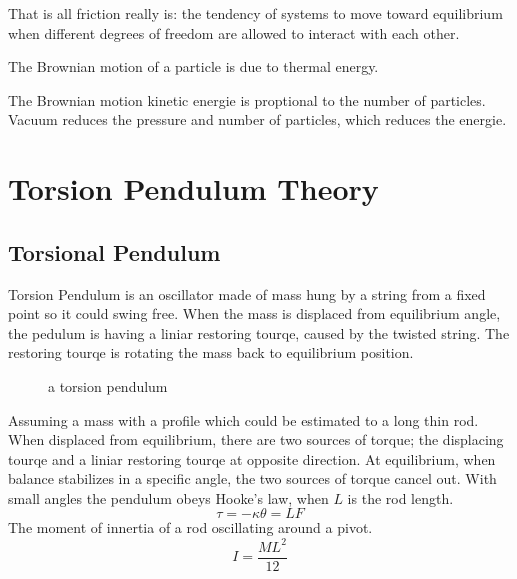 \documentclass[\main/master.tex]{subfiles}
\begin{document}
That is all friction really is: the tendency of systems to move toward equilibrium when different degrees of freedom are allowed to interact with each other.

The Brownian motion of a particle is due to thermal energy. 

The Brownian motion kinetic energie is proptional to the number of particles. Vacuum reduces the pressure and number of particles, which reduces the energie.
\par
  











\section{Torsion Pendulum Theory}
\subsection{Torsional Pendulum}
Torsion Pendulum is an oscillator made of mass hung by a string from a fixed point so it could swing free. When the mass is displaced from equilibrium angle, the pedulum is having a liniar restoring tourqe, caused by the twisted string. The restoring tourqe is rotating the mass back to equilibrium position.


\begin{figure}[htbp]
	\centering
	\caption[pendulum]{a torsion pendulum}
	\label{fig:torsion_pendulum}
\end{figure}

Assuming a mass with a profile which could be estimated to a long thin rod. When displaced from equilibrium, there are two sources of torque; the displacing tourqe and a liniar restoring tourqe at opposite direction. At equilibrium, when balance stabilizes in a specific angle, the two sources of torque cancel out. With small angles the pendulum obeys Hooke’s law, when $L$ is the rod length.
\begin{equation}
\tau = -\kappa\theta = LF    \label{eqn:Hooke_law}
\end{equation}
The moment of innertia of a rod oscillating around a pivot.
\begin{equation}
I = \frac{ML^2}{12}     \label{eqn:moment_innertia}
\end{equation}  
\end{document}
